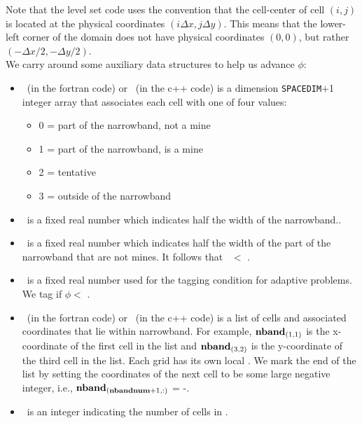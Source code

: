 Note that the level set code uses the convention that the cell-center of cell $(i,j)$ is located at the physical coordinates $(i\Delta x,j\Delta y)$.  This means that the lower-left corner of the domain does not have physical coordinates $(0,0)$, but rather $(-\Delta x/2,-\Delta y/2)$.\\

We carry around some auxiliary data structures to help us advance $\phi$:

\begin{itemize}

\item \type~(in the fortran code) or \LStype~(in the c++ code) is a dimension {\tt SPACEDIM}+1 integer array that associates each cell with one of four values:

\begin{itemize}
\item 0 = part of the narrowband, not a mine
\item 1 = part of the narrowband, is a mine
\item 2 = tentative
\item 3 = outside of the narrowband
\end{itemize}

\item \nbandwidth~is a fixed real number which indicates half the width of the narrowband..

\item \mineloc~is a fixed real number which indicates half the width of the part of the narrowband that are not mines.  It follows that \mineloc~$<$ \nbandwidth.

\item \lvlerr~is a fixed real number used for the tagging condition for adaptive problems.  We tag if $\phi <$ \lvlerr.

\item \nband~(in the fortran code) or \LSnband~(in the c++ code) is a list of cells and associated coordinates that lie within narrowband.  For example, ${\tt{\bf nband}}_{(1,1)}$ is the x-coordinate of the first cell in the list and ${\tt{\bf nband}}_{(3,2)}$ is the y-coordinate of the third cell in the list.  Each grid has its own local \nband.  We mark the end of the list by setting the coordinates of the next cell to be some large negative integer, i.e., ${\tt{\bf nband}}_{({\tt{\bf nbandnum}}+1,:)}$ = -\LARGEINT.

\item \nbandnum~is an integer indicating the number of cells in \nband.


\end{itemize}
